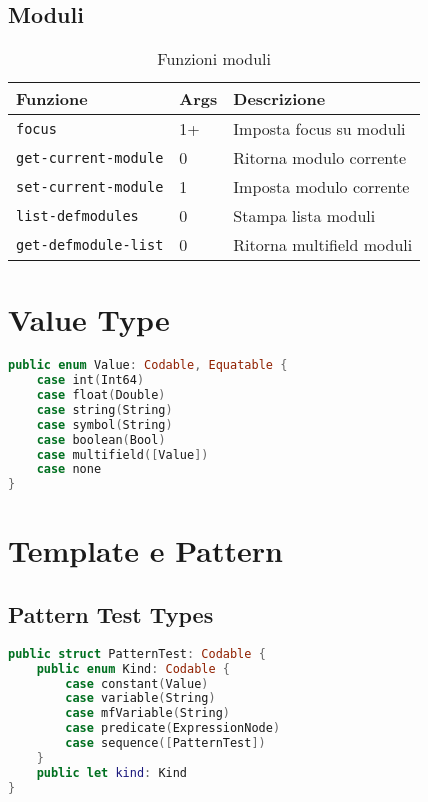 \subsection{Moduli}

\begin{table}[h]
\centering
\small
\begin{tabular}{@{}llp{5cm}@{}}
\toprule
\textbf{Funzione} & \textbf{Args} & \textbf{Descrizione} \\
\midrule
\texttt{focus} & 1+ & Imposta focus su moduli \\
\texttt{get-current-module} & 0 & Ritorna modulo corrente \\
\texttt{set-current-module} & 1 & Imposta modulo corrente \\
\texttt{list-defmodules} & 0 & Stampa lista moduli \\
\texttt{get-defmodule-list} & 0 & Ritorna multifield moduli \\
\bottomrule
\end{tabular}
\caption{Funzioni moduli}
\label{tab:api_modules}
\end{table}

\section{Value Type}

\begin{lstlisting}[language=Swift]
public enum Value: Codable, Equatable {
    case int(Int64)
    case float(Double)
    case string(String)
    case symbol(String)
    case boolean(Bool)
    case multifield([Value])
    case none
}
\end{lstlisting}

\section{Template e Pattern}

\subsection{Pattern Test Types}

\begin{lstlisting}[language=Swift]
public struct PatternTest: Codable {
    public enum Kind: Codable {
        case constant(Value)
        case variable(String)
        case mfVariable(String)
        case predicate(ExpressionNode)
        case sequence([PatternTest])
    }
    public let kind: Kind
}
\end{lstlisting}

